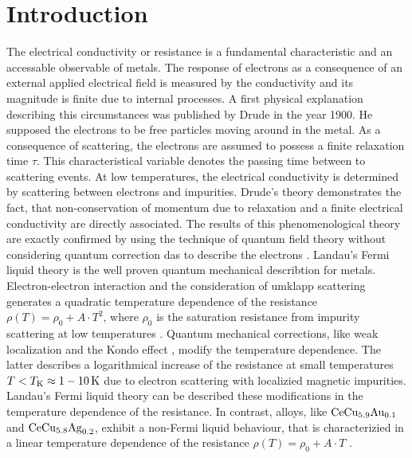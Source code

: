 %
%
\chapter{Introduction}
\label{ch:introduction}
%
%
The electrical conductivity or resistance is a fundamental characteristic and an accessable observable of metals.
The response of electrons as a consequence of an external applied electrical field is measured by the conductivity and its magnitude is finite due to internal processes.
A first physical explanation describing this circumstances was published by Drude \cite{Drude} in the year 1900.
He supposed the electrons to be free particles moving around in the metal.
As a consequence of scattering, the electrons are assumed to possess a finite relaxation time $\tau$.
This characteristical variable denotes the passing time between to scattering events.
At low temperatures, the electrical conductivity is determined by scattering between electrons and impurities.
Drude's theory demonstrates the fact, that non-conservation of momentum due to relaxation and a finite electrical conductivity are directly associated.
The results of this phenomenological theory are exactly confirmed by using the technique of quantum field theory without considering quantum correction  das to describe the electrons \cite{Bruus&Flensberg}.
Landau's Fermi liquid theory is the well proven quantum mechanical describtion for metals.
Electron-electron interaction and the consideration of umklapp scattering generates a quadratic temperature dependence of the resistance $\rho(T) = \rho_{0} + A \cdot T^{2}$, where $\rho_{0}$ is the saturation resistance from impurity scattering at low temperatures \cite{Bader,Pal}.
Quantum mechanical corrections, like weak localization \cite{Altshuler} and the Kondo effect \cite{Kondo}, modify the temperature dependence.
The latter describes a logarithmical increase of the resistance at small temperatures $T < T_{\mathrm{K}} \approx 1-10\,\mathrm{K}$ \cite{Kouwenhoven&Glazman} due to electron scattering with localizied magnetic impurities.
Landau's Fermi liquid theory can be described these modifications in the temperature dependence of the resistance.
In contrast, alloys, like $\mathrm{CeCu}_{5.9}\mathrm{Au}_{0.1}$ and $\mathrm{CeCu}_{5.8}\mathrm{Ag}_{0.2}$, exhibit a non-Fermi liquid behaviour, that is characterizied in a linear temperature dependence of the resistance $\rho(T) = \rho_{0} + A \cdot T$ \cite{Loehneysen}. 


